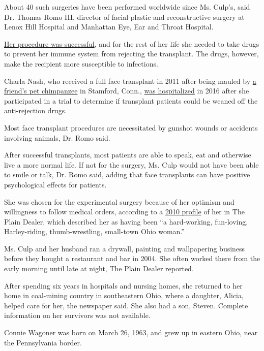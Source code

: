 About 40 such surgeries have been performed worldwide since Ms. Culp's,
said Dr. Thomas Romo III, director of facial plastic and reconstructive
surgery at Lenox Hill Hospital and Manhattan Eye, Ear and Throat
Hospital.

\href{https://www.nytimes.com/2008/12/18/health/s18face.html}{Her
procedure was successful}, and for the rest of her life she needed to
take drugs to prevent her immune system from rejecting the transplant.
The drugs, however, make the recipient more susceptible to infections.

Charla Nash, who received a full face transplant in 2011 after being
mauled by
\href{https://abcnews.go.com/US/sandra-herold-owner-chimp-travis-mauled-charla-nash-dies/story?id=10740652}{a
friend's pet chimpanzee} in Stamford, Conn.,
\href{https://www.nytimes.com/2016/05/06/nyregion/chimpanzee-attack-victim-who-got-face-transplant-is-hospitalized.html}{was
hospitalized} in 2016 after she participated in a trial to determine if
transplant patients could be weaned off the anti-rejection drugs.

Most face transplant procedures are necessitated by gunshot wounds or
accidents involving animals, Dr. Romo said.

After successful transplants, most patients are able to speak, eat and
otherwise live a more normal life. If not for the surgery, Ms. Culp
would not have been able to smile or talk, Dr. Romo said, adding that
face transplants can have positive psychological effects for patients.

She was chosen for the experimental surgery because of her optimism and
willingness to follow medical orders, according to a
\href{https://www.cleveland.com/healthfit/2010/11/woman_who_underwent_first_near.html}{2010
profile} of her in The Plain Dealer, which described her as having been
``a hard-working, fun-loving, Harley-riding, thumb-wrestling, small-town
Ohio woman.''

Ms. Culp and her husband ran a drywall, painting and wallpapering
business before they bought a restaurant and bar in 2004. She often
worked there from the early morning until late at night, The Plain
Dealer reported.

After spending six years in hospitals and nursing homes, she returned to
her home in coal-mining country in southeastern Ohio, where a daughter,
Alicia, helped care for her, the newspaper said. She also had a son,
Steven. Complete information on her survivors was not available.

Connie Wagoner was born on March 26, 1963, and grew up in eastern Ohio,
near the Pennsylvania border.

